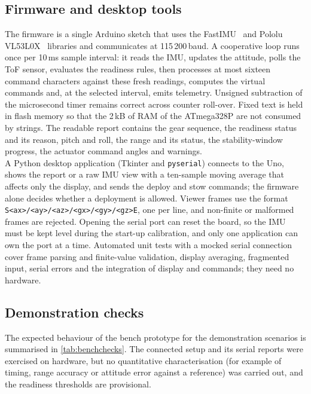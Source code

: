 \documentclass[11pt,a4paper]{article}
\DeclareRobustCommand{\code}[1]{{\let\_\codeus\texttt{#1}}}
\newcommand{\codeus}{\textunderscore\allowbreak{}}
\begin{document}
\subsection{Firmware and desktop tools}
The firmware is a single Arduino sketch that uses the FastIMU~\cite{fastimu} and Pololu VL53L0X~\cite{pololu} libraries and communicates at 115\,200\,baud. A cooperative loop runs once per 10\,ms sample interval: it reads the IMU, updates the attitude, polls the ToF sensor, evaluates the readiness rules, then processes at most sixteen command characters against these fresh readings, computes the virtual commands and, at the selected interval, emits telemetry. Unsigned subtraction of the microsecond timer remains correct across counter roll-over. Fixed text is held in flash memory so that the 2\,kB of RAM of the ATmega328P are not consumed by strings. The readable report contains the gear sequence, the readiness status and its reason, pitch and roll, the range and its status, the stability-window progress, the actuator command angles and warnings.
\\
\noindent 
A Python desktop application (Tkinter and \code{pyserial}) connects to the Uno, shows the report or a raw IMU view with a ten-sample moving average that affects only the display, and sends the deploy and stow commands; the firmware alone decides whether a deployment is allowed. Viewer frames use the format \code{S<ax>/<ay>/<az>/<gx>/<gy>/<gz>E}, one per line, and non-finite or malformed frames are rejected. Opening the serial port can reset the board, so the IMU must be kept level during the start-up calibration, and only one application can own the port at a time. Automated unit tests with a mocked serial connection cover frame parsing and finite-value validation, display averaging, fragmented input, serial errors and the integration of display and commands; they need no hardware.
 
\subsection{Demonstration checks}
The expected behaviour of the bench prototype for the demonstration scenarios is summarised in \cref{tab:benchchecks}. The connected setup and its serial reports were exercised on hardware, but no quantitative characterisation (for example of timing, range accuracy or attitude error against a reference) was carried out, and the readiness thresholds are provisional.
 
\end{document}
